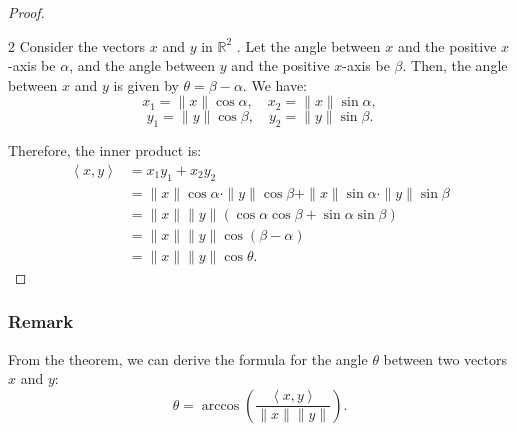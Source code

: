 \documentclass[11pt]{article}
\newcommand{\inner}[2]{\left\langle #1, #2 \right\rangle}
\begin{document}
\begin{proof}
    \begin{multicols}{2}
    Consider the vectors $x$ and $y$ in $\mathbb{R}^2$ . Let the angle between $x$ and the positive $x$-axis be $\alpha$, and the angle between $y$ and the positive $x$-axis be $\beta$. Then, the angle between $x$ and $y$ is given by $\theta = \beta - \alpha$. We have:
        \[x_1 = \|x\| \cos \alpha, \quad x_2 = \|x\| \sin \alpha,\]
        \[y_1 = \|y\| \cos \beta, \quad y_2 = \|y\| \sin \beta.\]
    \vspace{2cm}
    \begin{center}
    \end{center}
\end{multicols}

Therefore, the inner product is:
\begin{align*}
\inner{x}{y} & = x_1 y_1 + x_2 y_2 \\
& = \|x\| \cos \alpha \cdot \|y\| \cos \beta + \|x\| \sin \alpha \cdot \|y\| \sin \beta \\
& = \|x\| \|y\| (\cos \alpha \cos \beta + \sin \alpha \sin \beta) \\
& = \|x\| \|y\| \cos(\beta - \alpha) \\
& = \|x\| \|y\| \cos \theta.
\end{align*}
\end{proof}

\subsubsection*{Remark}
From the theorem, we can derive the formula for the angle $\theta$ between two vectors $x$ and $y$:
\[ \theta = \arccos \left( \frac{\inner{x}{y}}{\|x\| \|y\|} \right). \]
\end{document}

